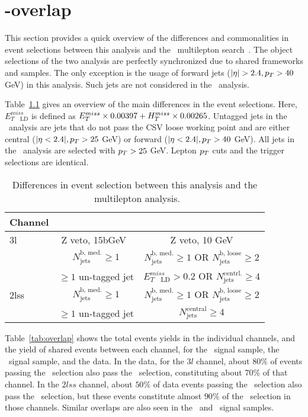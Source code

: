 \chapter{\tHq-\ttH overlap}\label{app:overlap}

This section provides a quick overview of the differences and commonalities in event selections between this analysis and the \ttH\ multilepton search~\cite{CMS_AN_2017-029}. The object selections of the two analysis are perfectly synchronized due to shared frameworks and samples. The only exception is the usage of forward jets ($|\eta|>2.4, \pt>40$ GeV) in this analysis. Such jets are not considered in the \ttH\ analysis.

Table~\ref{tab:seldiffs} gives an overview of the main differences in the event selections. Here, $E^{miss}_{T\quad\text{LD}}$ is defined as $E_T^{miss}\times0.00397 + H_{T}^{miss}\times0.00265$. Untagged jets in the \tHq\ analysis are jets that do not pass the CSV loose working point and are either central ($|\eta<2.4|, p_T>25$ GeV) or forward ($|\eta<2.4|, p_T>40$ GeV). All jets in the \ttH\ analysis are selected with $p_T>25$ GeV. Lepton $p_T$ cuts and the trigger selections are identical.

\begin{table}[h!]
\centering
\begin{tabular}{l|cc}
	Channel & \tHq & \ttH \\ \hline
	3l   & Z veto, 15bGeV\ & Z veto, 10 GeV\\\ 
	     & $N_\text{jets}^\text{b, med.}\geq1$ &
	       $N_\text{jets}^\text{b, med.}\geq1$ OR
	       $N_\text{jets}^\text{b, loose}\geq2$ \\\ 
	     & $\geq1$ un-tagged jet & $E^{miss}_{T\quad\text{LD}}> 0.2$ OR $N_\text{jets}^\text{centrl.}\geq4$ \\ \hline
	2lss & $N_\text{jets}^\text{b, med.}\geq1$ &
	       $N_\text{jets}^\text{b, med.}\geq1$ OR
	       $N_\text{jets}^\text{b, loose}\geq2$ \\\ 
	     & $\geq1$ un-tagged jet & $N_\text{jets}^\text{central}\geq4$ \\
\end{tabular}
\caption[Differences in event selection \tHq-\ttH\ multilepton analysis.]{Differences in event selection between this analysis and the \ttH\ multilepton analysis.}\label{tab:seldiffs}
\end{table}

Table~\ref{tab:overlap} shows the total events yields in the individual channels, and the yield of shared events between each channel, for the \tHq\ signal sample, the \ttH\ signal sample, and the data.
In the data, for the $3l$ channel, about $80\%$ of events passing the \tHq\ selection also pass the \ttH\ selection, constituting about $70\%$ of that channel. In the $2lss$ channel, about $50\%$ of data events passing the \tHq\ selection also pass the \ttH\ selection, but these events constitute almost $90\%$ of the \ttH\ selection in those channels. Similar overlaps are also seen in the \tHq\ and \ttH\ signal samples.

